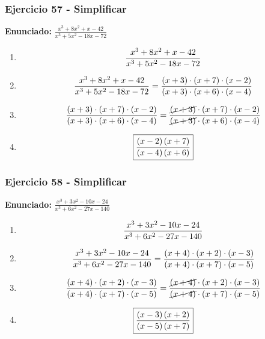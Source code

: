 \documentclass[11pt,a4paper]{article}
\newcommand{\fitmath}[1]{%
\[
\setbox0=\hbox{$\displaystyle #1$}%
\ifdim\wd0>\linewidth
\resizebox{\linewidth}{!}{$\displaystyle #1$}%
\else
#1%
\fi
\]
}
\begin{document}
\vspace{0.12cm}
\subsubsection*{Ejercicio 57 - Simplificar}
\textbf{Enunciado:} $ \frac{x^{3} + 8 x^{2} + x - 42}{x^{3} + 5 x^{2} - 18 x - 72} $\par
\begin{enumerate}[leftmargin=2em]
\item \fitmath{\frac{x^{3} + 8 x^{2} + x - 42}{x^{3} + 5 x^{2} - 18 x - 72}}
\item \fitmath{\frac{x^{3} + 8 x^{2} + x - 42}{x^{3} + 5 x^{2} - 18 x - 72}=\frac{\left(x + 3\right)\cdot \left(x + 7\right)\cdot \left(x - 2\right)}{\left(x + 3\right)\cdot \left(x + 6\right)\cdot \left(x - 4\right)}}
\item \fitmath{\frac{\left(x + 3\right)\cdot \left(x + 7\right)\cdot \left(x - 2\right)}{\left(x + 3\right)\cdot \left(x + 6\right)\cdot \left(x - 4\right)}=\frac{\cancel{\left(x + 3\right)}\cdot \left(x + 7\right)\cdot \left(x - 2\right)}{\cancel{\left(x + 3\right)}\cdot \left(x + 6\right)\cdot \left(x - 4\right)}}
\item \fitmath{\boxed{\frac{\left(x - 2\right) \left(x + 7\right)}{\left(x - 4\right) \left(x + 6\right)}}}
\end{enumerate}

\vspace{0.12cm}
\subsubsection*{Ejercicio 58 - Simplificar}
\textbf{Enunciado:} $ \frac{x^{3} + 3 x^{2} - 10 x - 24}{x^{3} + 6 x^{2} - 27 x - 140} $\par
\begin{enumerate}[leftmargin=2em]
\item \fitmath{\frac{x^{3} + 3 x^{2} - 10 x - 24}{x^{3} + 6 x^{2} - 27 x - 140}}
\item \fitmath{\frac{x^{3} + 3 x^{2} - 10 x - 24}{x^{3} + 6 x^{2} - 27 x - 140}=\frac{\left(x + 4\right)\cdot \left(x + 2\right)\cdot \left(x - 3\right)}{\left(x + 4\right)\cdot \left(x + 7\right)\cdot \left(x - 5\right)}}
\item \fitmath{\frac{\left(x + 4\right)\cdot \left(x + 2\right)\cdot \left(x - 3\right)}{\left(x + 4\right)\cdot \left(x + 7\right)\cdot \left(x - 5\right)}=\frac{\cancel{\left(x + 4\right)}\cdot \left(x + 2\right)\cdot \left(x - 3\right)}{\cancel{\left(x + 4\right)}\cdot \left(x + 7\right)\cdot \left(x - 5\right)}}
\item \fitmath{\boxed{\frac{\left(x - 3\right) \left(x + 2\right)}{\left(x - 5\right) \left(x + 7\right)}}}
\end{enumerate}
\end{document}
